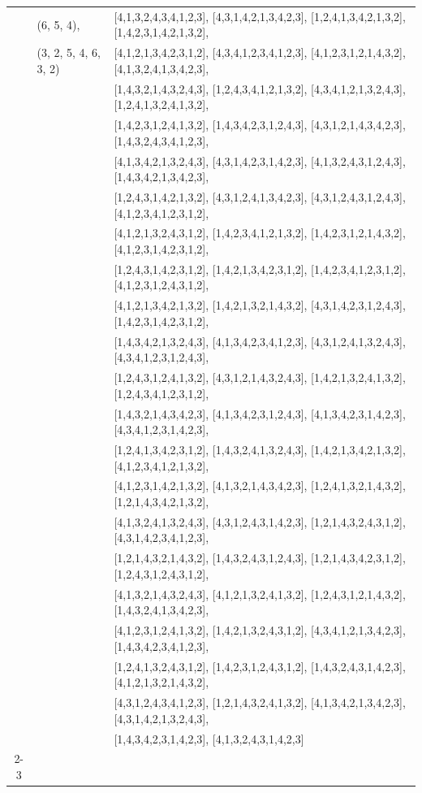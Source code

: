 \documentclass[10pt]{amsart}
\numberwithin{equation}{section}
\theoremstyle{plain}
\theoremstyle{definition}
\theoremstyle{remark}
\begin{document}
{\begin{longtable}{c|l|l}
		& (6, 5, 4), & [4,1,3,2,4,3,4,1,2,3], [4,3,1,4,2,1,3,4,2,3], [1,2,4,1,3,4,2,1,3,2], [1,4,2,3,1,4,2,1,3,2], \\
		& (3, 2, 5, 4, 6, 3, 2) & [4,1,2,1,3,4,2,3,1,2], [4,3,4,1,2,3,4,1,2,3], [4,1,2,3,1,2,1,4,3,2], [4,1,3,2,4,1,3,4,2,3], \\
		&  & [1,4,3,2,1,4,3,2,4,3], [1,2,4,3,4,1,2,1,3,2], [4,3,4,1,2,1,3,2,4,3], [1,2,4,1,3,2,4,1,3,2], \\
		&  & [1,4,2,3,1,2,4,1,3,2], [1,4,3,4,2,3,1,2,4,3], [4,3,1,2,1,4,3,4,2,3], [1,4,3,2,4,3,4,1,2,3], \\
		&  & [4,1,3,4,2,1,3,2,4,3], [4,3,1,4,2,3,1,4,2,3], [4,1,3,2,4,3,1,2,4,3], [1,4,3,4,2,1,3,4,2,3], \\
		&  & [1,2,4,3,1,4,2,1,3,2], [4,3,1,2,4,1,3,4,2,3], [4,3,1,2,4,3,1,2,4,3], [4,1,2,3,4,1,2,3,1,2], \\
		&  & [4,1,2,1,3,2,4,3,1,2], [1,4,2,3,4,1,2,1,3,2], [1,4,2,3,1,2,1,4,3,2], [4,1,2,3,1,4,2,3,1,2], \\
		&  & [1,2,4,3,1,4,2,3,1,2], [1,4,2,1,3,4,2,3,1,2], [1,4,2,3,4,1,2,3,1,2], [4,1,2,3,1,2,4,3,1,2], \\
		&  & [4,1,2,1,3,4,2,1,3,2], [1,4,2,1,3,2,1,4,3,2], [4,3,1,4,2,3,1,2,4,3], [1,4,2,3,1,4,2,3,1,2], \\
		&  & [1,4,3,4,2,1,3,2,4,3], [4,1,3,4,2,3,4,1,2,3], [4,3,1,2,4,1,3,2,4,3], [4,3,4,1,2,3,1,2,4,3], \\
		&  & [1,2,4,3,1,2,4,1,3,2], [4,3,1,2,1,4,3,2,4,3], [1,4,2,1,3,2,4,1,3,2], [1,2,4,3,4,1,2,3,1,2], \\
		&  & [1,4,3,2,1,4,3,4,2,3], [4,1,3,4,2,3,1,2,4,3], [4,1,3,4,2,3,1,4,2,3], [4,3,4,1,2,3,1,4,2,3], \\
		&  & [1,2,4,1,3,4,2,3,1,2], [1,4,3,2,4,1,3,2,4,3], [1,4,2,1,3,4,2,1,3,2], [4,1,2,3,4,1,2,1,3,2], \\
		&  & [4,1,2,3,1,4,2,1,3,2], [4,1,3,2,1,4,3,4,2,3], [1,2,4,1,3,2,1,4,3,2], [1,2,1,4,3,4,2,1,3,2], \\
		&  & [4,1,3,2,4,1,3,2,4,3], [4,3,1,2,4,3,1,4,2,3], [1,2,1,4,3,2,4,3,1,2], [4,3,1,4,2,3,4,1,2,3], \\
		&  & [1,2,1,4,3,2,1,4,3,2], [1,4,3,2,4,3,1,2,4,3], [1,2,1,4,3,4,2,3,1,2], [1,2,4,3,1,2,4,3,1,2], \\
		&  & [4,1,3,2,1,4,3,2,4,3], [4,1,2,1,3,2,4,1,3,2], [1,2,4,3,1,2,1,4,3,2], [1,4,3,2,4,1,3,4,2,3], \\
		&  & [4,1,2,3,1,2,4,1,3,2], [1,4,2,1,3,2,4,3,1,2], [4,3,4,1,2,1,3,4,2,3], [1,4,3,4,2,3,4,1,2,3], \\
		&  & [1,2,4,1,3,2,4,3,1,2], [1,4,2,3,1,2,4,3,1,2], [1,4,3,2,4,3,1,4,2,3], [4,1,2,1,3,2,1,4,3,2], \\
		&  & [4,3,1,2,4,3,4,1,2,3], [1,2,1,4,3,2,4,1,3,2], [4,1,3,4,2,1,3,4,2,3], [4,3,1,4,2,1,3,2,4,3], \\
		&  & [1,4,3,4,2,3,1,4,2,3], [4,1,3,2,4,3,1,4,2,3] \\ \cline{2-3}
		

\end{longtable}}
\end{document}
